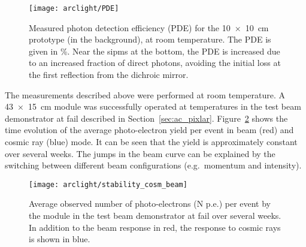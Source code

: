 \begin{figure}[htb]
	\centering
	\texttt{[image: arclight/PDE]}
	\caption{Measured photon detection efficiency (PDE) for the \SI{10 x 10}{\centi\metre} \AL{} prototype (in the background), at room temperature.
		The PDE is given in \si{\percent}.
		Near the \glspl{sipm} at the bottom, the PDE is increased due to an increased fraction of direct photons, avoiding the initial loss at the first reflection from the dichroic mirror.}
	\label{fig:arclight_pde}
\end{figure}

The measurements described above were performed at room temperature.
A \SI{43 x 15}{\centi\metre} \AL{} module was successfully operated at \lar{} temperatures in the \pixlar{} test beam demonstrator at \gls{fail} described in Section~\ref{sec:ac_pixlar}.
Figure~\ref{fig:arclight_pixlar} shows the time evolution of the average photo-electron yield per event in beam (red) and cosmic ray (blue) mode.
It can be seen that the yield is approximately constant over several weeks.
The jumps in the beam curve can be explained by the switching between different beam configurations (e.g.\ momentum and intensity).


\begin{figure}[htb]
	\centering
	\texttt{[image: arclight/stability\_cosm\_beam]}
	\caption{Average observed number of photo-electrons (N p.e.) per event by the \AL{} module in the \pixlar{} test beam demonstrator at \gls{fail} over several weeks.
		In addition to the beam response in red, the response to cosmic rays is shown in blue.}
	\label{fig:arclight_pixlar}
\end{figure}